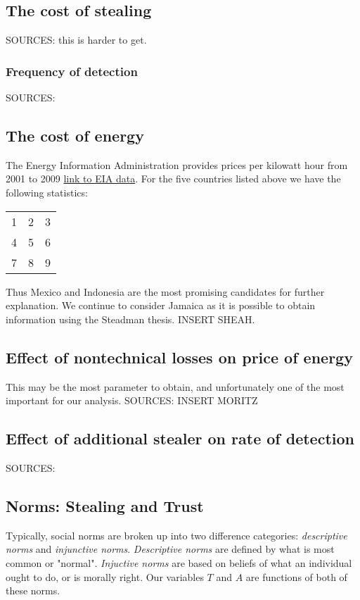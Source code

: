 \documentclass{article}
\begin{document}
\subsection{The cost of stealing}
SOURCES:  this is harder to get. 
\subsubsection{Frequency of detection}
SOURCES: 
\subsection{The cost of energy}
The Energy Information Administration provides prices per kilowatt hour from 2001 to 2009 \href{http://www.eia.gov/countries/prices/electricity_households.cfm}{ link to EIA data}. For the five countries listed above we have the following statistics: 

\begin{tabular}{ l c r }
  1 & 2 & 3 \\
  4 & 5 & 6 \\
  7 & 8 & 9 \\
\end{tabular}

Thus Mexico and Indonesia are the most promising candidates for further explanation. We continue to consider Jamaica as it is possible to obtain information using the Steadman thesis. INSERT SHEAH. 
 
\subsection{Effect of nontechnical losses on price of energy}
This may be the most parameter to obtain, and unfortunately one of the most important for our analysis. 
SOURCES: INSERT MORITZ
\subsection{Effect of additional stealer on rate of detection}
SOURCES: 
\subsection{Norms: Stealing and Trust}

Typically, social norms are broken up into two difference categories: 
\textit{descriptive norms} and \textit{injunctive norms}. \textit{Descriptive norms} are defined by what is most common or "normal". \textit{Injuctive norms} are based on beliefs of what an individual ought to do, or is morally right. Our variables $T$ and $A$ are functions of both of these norms.
\\
\end{document}

